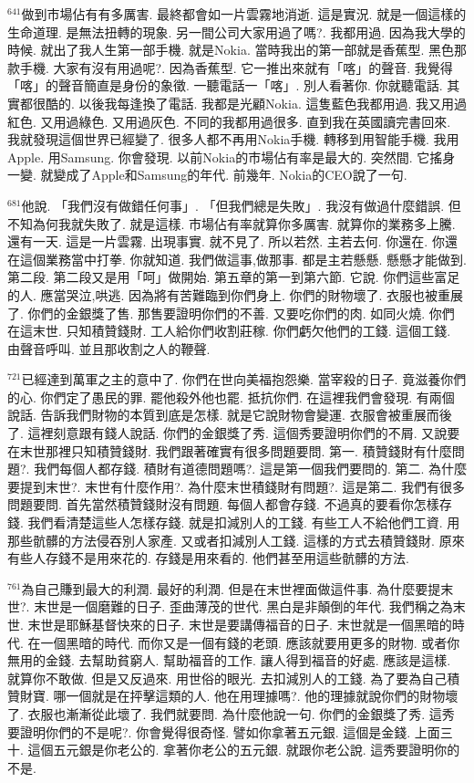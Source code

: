 \documentclass{book}
\begin{document}
$^{641}$做到市場佔有有多厲害.
最終都會如一片雲霧地消逝.
這是實況.
就是一個這樣的生命道理.
是無法扭轉的現象.
另一間公司大家用過了嗎?.
我都用過.
因為我大學的時候.
就出了我人生第一部手機.
就是Nokia.
當時我出的第一部就是香蕉型.
黑色那款手機.
大家有沒有用過呢?.
因為香蕉型.
它一推出來就有「喀」的聲音.
我覺得「喀」的聲音簡直是身份的象徵.
一聽電話一「喀」.
別人看著你.
你就聽電話.
其實都很酷的.
以後我每逢換了電話.
我都是光顧Nokia.
這隻藍色我都用過.
我又用過紅色.
又用過綠色.
又用過灰色.
不同的我都用過很多.
直到我在英國讀完書回來.
我就發現這個世界已經變了.
很多人都不再用Nokia手機.
轉移到用智能手機.
我用Apple.
用Samsung.
你會發現.
以前Nokia的市場佔有率是最大的.
突然間.
它搖身一變.
就變成了Apple和Samsung的年代.
前幾年.
Nokia的CEO說了一句.

$^{681}$他說.
「我們沒有做錯任何事」.
「但我們總是失敗」.
我沒有做過什麼錯誤.
但不知為何我就失敗了.
就是這樣.
市場佔有率就算你多厲害.
就算你的業務多上騰.
還有一天.
這是一片雲霧.
出現事實.
就不見了.
所以若然.
主若去何.
你還在.
你還在這個業務當中打拳.
你就知道.
我們做這事,做那事.
都是主若懸懸.
懸懸才能做到.
第二段.
第二段又是用「呵」做開始.
第五章的第一到第六節.
它說.
你們這些富足的人.
應當哭泣,哄逃.
因為將有苦難臨到你們身上.
你們的財物壞了.
衣服也被重展了.
你們的金銀獎了售.
那售要證明你們的不善.
又要吃你們的肉.
如同火燒.
你們在這末世.
只知積贊錢財.
工人給你們收割莊稼.
你們虧欠他們的工錢.
這個工錢.
由聲音呼叫.
並且那收割之人的鞭聲.

$^{721}$已經達到萬軍之主的意中了.
你們在世向美福抱怨樂.
當宰殺的日子.
竟滋養你們的心.
你們定了愚民的罪.
罷他殺外他也罷.
抵抗你們.
在這裡我們會發現.
有兩個說話.
告訴我們財物的本質到底是怎樣.
就是它說財物會變運.
衣服會被重展而後了.
這裡刻意跟有錢人說話.
你們的金銀獎了秀.
這個秀要證明你們的不屑.
又說要在末世那裡只知積贊錢財.
我們跟著確實有很多問題要問.
第一.
積贊錢財有什麼問題?.
我們每個人都存錢.
積財有道德問題嗎?.
這是第一個我們要問的.
第二.
為什麼要提到末世?.
末世有什麼作用?.
為什麼末世積錢財有問題?.
這是第二.
我們有很多問題要問.
首先當然積贊錢財沒有問題.
每個人都會存錢.
不過真的要看你怎樣存錢.
我們看清楚這些人怎樣存錢.
就是扣減別人的工錢.
有些工人不給他們工資.
用那些骯髒的方法侵吞別人家產.
又或者扣減別人工錢.
這樣的方式去積贊錢財.
原來有些人存錢不是用來花的.
存錢是用來看的.
他們甚至用這些骯髒的方法.

$^{761}$為自己賺到最大的利潤.
最好的利潤.
但是在末世裡面做這件事.
為什麼要提末世?.
末世是一個磨難的日子.
歪曲薄茂的世代.
黑白是非顛倒的年代.
我們稱之為末世.
末世是耶穌基督快來的日子.
末世是要講傳福音的日子.
末世就是一個黑暗的時代.
在一個黑暗的時代.
而你又是一個有錢的老頭.
應該就要用更多的財物.
或者你無用的金錢.
去幫助貧窮人.
幫助福音的工作.
讓人得到福音的好處.
應該是這樣.
就算你不敢做.
但是又反過來.
用世俗的眼光.
去扣減別人的工錢.
為了要為自己積贊財寶.
哪一個就是在抨擊這類的人.
他在用理據嗎?.
他的理據就說你們的財物壞了.
衣服也漸漸從此壞了.
我們就要問.
為什麼他說一句.
你們的金銀獎了秀.
這秀要證明你們的不是呢?.
你會覺得很奇怪.
譬如你拿著五元銀.
這個是金錢.
上面三十.
這個五元銀是你老公的.
拿著你老公的五元銀.
就跟你老公說.
這秀要證明你的不是.
\end{document}
